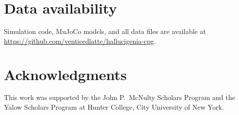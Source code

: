 \documentclass[12pt]{article}
\begin{document}
\section*{Data availability}

Simulation code, MuJoCo models, and all data files are available at
\url{https://github.com/venticedlatte/hallucigenia-cpg}.

\section*{Acknowledgments}

This work was supported by the John P.\ McNulty Scholars Program
and the Yalow Scholars Program at Hunter College, City University
of New York.


\end{document}
